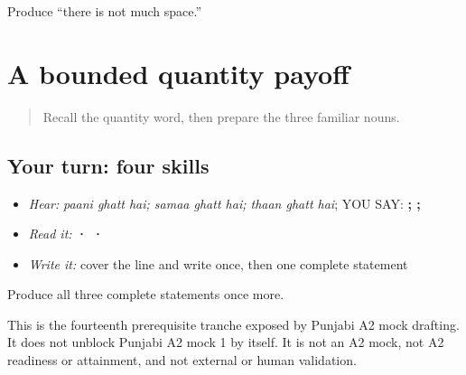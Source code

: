 \begin{tcolorbox}[breakable,colback=teal!4,colframe=teal!35!black,title={Before you move on}]
Produce “there is not much space.”
\end{tcolorbox}
\section[\texorpdfstring{\pa{ਪਾਣੀ} \pa{ਘੱਟ} \pa{ਹੈ} · \pa{ਸਮਾਂ} … (paani ghatt hai …)}{ਪਾਣੀ ਘੱਟ ਹੈ · ਸਮਾਂ … (paani ghatt hai …)}]{A bounded quantity payoff}

\label{lesson:PA-C191-payoff}



\begin{quote}
Recall the quantity word, then prepare the three familiar nouns.
\end{quote}

\subsection*{Your turn: four skills}
\begin{itemize}
\raggedright
  \item \emph{Hear:} \emph{paani ghatt hai; samaa ghatt hai; thaan ghatt hai}; YOU SAY: \textbf{  ;   ;   }
  \item \emph{Read it:} \textbf{   ·    ·   }
  \item \emph{Write it:} cover the line and write \textbf{} once, then one complete statement
\end{itemize}

\begin{tcolorbox}[breakable,colback=teal!4,colframe=teal!35!black,title={Before you move on}]
Produce all three complete statements once more.

This is the fourteenth prerequisite tranche exposed by Punjabi A2 mock drafting. It does not unblock Punjabi A2 mock 1 by itself. It is not an A2 mock, not A2 readiness or attainment, and not external or human validation.
\end{tcolorbox}
